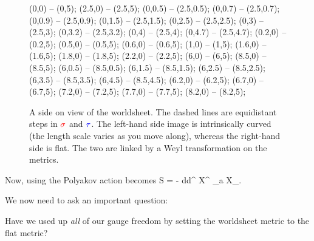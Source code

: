 \begin{figure}
    \begin{center}
        \btik 
             (0,0) -- (0,5);
             (2.5,0) -- (2.5,5);
             (0,0.5) -- (2.5,0.5);
             (0,0.7) -- (2.5,0.7);
              (0,0.9) -- (2.5,0.9);
             (0,1.5) -- (2.5,1.5);
             (0,2.5) -- (2.5,2.5);
             (0,3) -- (2.5,3);
             (0,3.2) -- (2.5,3.2);
             (0,4) -- (2.5,4);
             (0,4.7) -- (2.5,4.7);
             (0.2,0) -- (0.2,5);
             (0.5,0) -- (0.5,5);
             (0.6,0) -- (0.6,5);
             (1,0) -- (1,5);
             (1.6,0) -- (1.6,5);
             (1.8,0) -- (1.8,5);
             (2.2,0) -- (2.2,5);
             (6,0) -- (6,5);
             (8.5,0) -- (8.5,5);
             (6,0.5) -- (8.5,0.5);
             (6,1.5) -- (8.5,1.5);
             (6,2.5) -- (8.5,2.5);
             (6,3.5) -- (8.5,3.5);
             (6,4.5) -- (8.5,4.5);
             (6.2,0) -- (6.2,5);
             (6.7,0) -- (6.7,5);
             (7.2,0) -- (7.2,5);
             (7.7,0) -- (7.7,5);
             (8.2,0) -- (8.2,5);
        \etik 
    \end{center}
    \caption{A side on view of the worldsheet. The dashed lines are equidistant steps in $\textcolor{red}{\sigma}$ and $\textcolor{blue}{\tau}$. The left-hand side image is intrinsically curved (the length scale varies as you move along), whereas the right-hand side is flat. The two are linked by a Weyl transformation on the metrics.}
    \label{fig:WeylMetricPolyakov}
\end{figure}

Now, using  the Polyakov action becomes
\be 
\label{eqn:PolyakovActionFlat}
    S = - \int d\sig d\tau \p^{\a} X^{\mu} \p_a X_{\mu}. 
\ee 

We now need to ask an important question: 

\begin{center}
    Have we used up \textit{all} of our gauge freedom by setting the worldsheet metric to the flat metric? 
\end{center}

